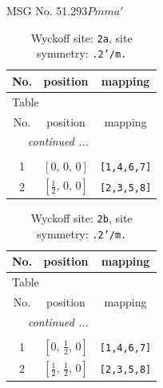 \documentclass[fleqn,8pt]{jsarticle}
\begin{document}
\setcounter{MaxMatrixCols}{32}

\renewcommand{\tablename}{Table~}
\renewcommand{\figurename}{Figure~}
\begin{center}
\LARGE
MSG No. 51.293\quad$Pmma'$
\end{center}
\renewcommand{\arraystretch}{1.2}
\begin{longtable}{ccc}
\caption{Wyckoff site: {\tt 2a}, site symmetry: {\tt .2'/m.}}
 \\
 \hline \hline
No. & position & mapping \\ \hline \endfirsthead

\multicolumn{2}{l}{\tablename\ \thetable{}} \\
 \hline \hline
No. & position & mapping \\ \hline \endhead

 \hline \hline
\multicolumn{2}{r}{\footnotesize\it continued ...} \\ \endfoot

 \hline \hline
\multicolumn{2}{r}{} \\ \endlastfoot

1 & $\left[ 0,\, 0,\, 0 \right]$ & {\tt [1,4,6,7]} \\ \hline
2 & $\left[ \frac{1}{2},\, 0,\, 0 \right]$ & {\tt [2,3,5,8]} \\
\end{longtable}
\renewcommand{\arraystretch}{1.2}
\begin{longtable}{ccc}
\caption{Wyckoff site: {\tt 2b}, site symmetry: {\tt .2'/m.}}
 \\
 \hline \hline
No. & position & mapping \\ \hline \endfirsthead

\multicolumn{2}{l}{\tablename\ \thetable{}} \\
 \hline \hline
No. & position & mapping \\ \hline \endhead

 \hline \hline
\multicolumn{2}{r}{\footnotesize\it continued ...} \\ \endfoot

 \hline \hline
\multicolumn{2}{r}{} \\ \endlastfoot

1 & $\left[ 0,\, \frac{1}{2},\, 0 \right]$ & {\tt [1,4,6,7]} \\ \hline
2 & $\left[ \frac{1}{2},\, \frac{1}{2},\, 0 \right]$ & {\tt [2,3,5,8]} \\
\end{longtable}
\renewcommand{\arraystretch}{1.2}
\end{document}
